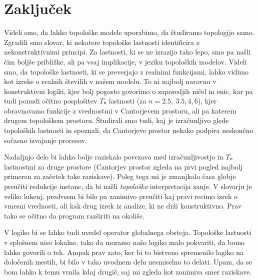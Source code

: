 \section{Zaključek}

Videli smo, da lahko topološke modele uporabimo, da študiramo topologijo samo.
Zgradili smo slovar, ki nekatere topološke lastnosti identificira z
nekonstruktivnimi principi. Za lastnosti, ki se ne izrazijo tako lepo, smo pa
našli čim boljše približke, ali pa vsaj implikacije, v jeziku topoloških
modelov. Videli smo, da topološke lastnosti, ki se preverjajo z realnimi
funkcijami, lahko vidimo kot izreke o realnih številih v našem modelu. To ni
najbolj naravno v konstruktivni logiki, kjer bolj pogosto govorimo o zaporedjih
ničel in enic, kar pa tudi ponudi očitno posplošitev \(Tₙ\) lastnosti
(za \(n = 2.5,~3.5,4,6\)), kjer obravnavamo funkcije z vrednostmi v Cantorjevem
prostoru, ali pa katerem drugem topološkem prostoru. Študirali smo tudi, kaj je
izračunljivo glede topoloških lastnosti in spoznali, da Cantorjeve prostor nekako
podpira neskončno sočasno izvajanje procesov.

Nadaljnjo delo bi lahko bolje raziskalo povezavo med izračunljivostjo in \(Tₙ\)
lastnostmi za druge prostore (Cantorjev prostor zgleda na prvi pogled najbolj
primeren za začetek take raziskave). Poleg tega mi je zmanjkalo časa globje
preučiti redukcije instanc, da bi našli \emph{topološko} interpretacija zanje.
V slovarju je veliko lukenj, predvsem bi bilo pa zanimivo preučiti kaj pravi
recimo izrek o vmesni vrednosti, ali kak drug izrek iz analize, ki ne drži
konstruktivno. Prav tako se očitno da program razširiti na okoliše.

V logiko bi se lahko tudi uvedel operator globalnega obstoja. Topološke
lastnosti v splošnem niso lokalne, tako da moramo našo logiko malo pokvariti, da
bomo lahko govorili o teh. Ampak prav zato, ker bi to bistveno spremenilo logiko
na določenih mestih, bi bilo v tako uvodnem delu nesmiselno to delati. Upam, da
se bom lahko k temu vrnila kdaj drugič, saj mi zgleda kot zanimiva smer raziskave.



